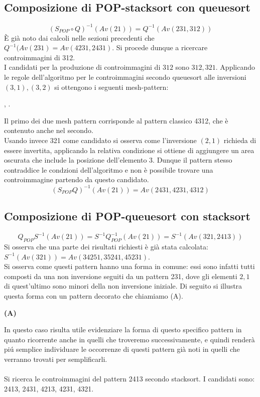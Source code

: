 \subsection{Composizione di {POP-stacksort} con {queuesort}}
$$(S_{POP}\circ{Q})^{-1}(Av(21))=Q^{-1}(Av(231,312))$$
\`E gi\`a noto dai calcoli nelle sezioni precedenti che $Q^{-1}(Av(231)=Av(4231,2431)$. Si procede dunque a ricercare controimmagini di 312.\\
I candidati per la produzione di controimmagini di $312$ sono $312, 321$. Applicando le regole dell'algoritmo per le controimmagini secondo queuesort alle inversioni $(3,1),(3,2)$ si ottengono i seguenti mesh-pattern:
\begin{center}
,
.
\end{center}
Il primo dei due mesh pattern corrisponde al pattern classico 4312, che \`e contenuto anche nel secondo.\\
Usando invece 321 come candidato si osserva come l'inversione $(2,1)$ richieda di essere invertita, applicando la relativa condizione si ottiene di aggiungere un area oscurata che include la posizione dell'elemento 3. Dunque il pattern stesso contraddice le condzioni dell'algoritmo e non \`e possibile trovare una controimmagine partendo da questo candidato.\\
$$(S_{POP}{Q})^{-1}(Av(21))=Av(2431,4231,4312)$$
\subsection{Composizione di {POP-queuesort} con {stacksort}}
$$Q_{POP}S^{-1}(Av(21)) = S^{-1}Q_{POP}^{-1}(Av(21)) = S^{-1}(Av(321, 2413))$$
Si osserva che una parte dei risultati richiesti \`e gi\`a stata calcolata: $S^{-1}(Av(321)) = Av(34251, 35241, 45231)$.\\
Si osserva come questi pattern hanno una forma in comune: essi sono infatti tutti composti da una non inversione seguiti da un pattern 231, dove gli elementi $2,1$ di quest'ultimo sono minori della non inversione iniziale. Di seguito si illustra questa forma con un pattern decorato che chiamiamo (A).
\begin{center}
\textbf{(A)}
\end{center}
In questo caso risulta utile evidenziare la forma di questo specifico pattern in quanto ricorrente anche in quelli che troveremo successivamente, e quindi render\`a pi\'u semplice individuare le occorrenze di questi pattern gi\`a noti in quelli che verranno trovati per semplificarli.\\\\
Si ricerca le controimmagini del pattern 2413 secondo stacksort. I candidati sono: 2413, 2431, 4213, 4231, 4321.
